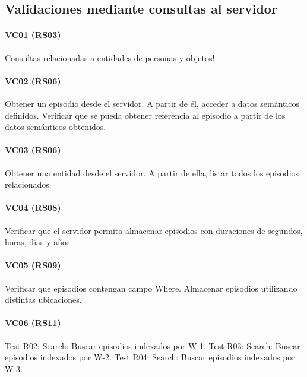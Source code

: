 \subsection{Validaciones mediante consultas al servidor}

\paragraph{VC01 (RS03)}
Consultas relacionadas a entidades de personas y objetos!



\paragraph{VC02 (RS06)}
Obtener un episodio desde el servidor. A partir de él, acceder a datos semánticos definidos. Verificar que se pueda obtener referencia al episodio a partir de los datos semánticos obtenidos.

\paragraph{VC03 (RS06)}
Obtener una entidad desde el servidor. A partir de ella, listar todos los episodios relacionados.

\paragraph{VC04 (RS08)}
Verificar que el servidor permita almacenar episodios con duraciones de segundos, horas, días y años.

\paragraph{VC05 (RS09)}
Verificar que episodios contengan campo Where. Almacenar episodios utilizando distintas ubicaciones.



\paragraph{VC06 (RS11)}
Test R02: Search: Buscar episodios indexados por W-1.
Test R03: Search: Buscar episodios indexados por W-2.
Test R04: Search: Buscar episodios indexados por W-3.




